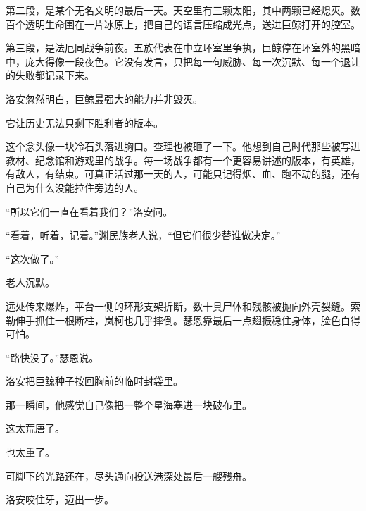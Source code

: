 第二段，是某个无名文明的最后一天。天空里有三颗太阳，其中两颗已经熄灭。数百个透明生命围在一片冰原上，把自己的语言压缩成光点，送进巨鲸打开的腔室。

第三段，是法厄同战争前夜。五族代表在中立环室里争执，巨鲸停在环室外的黑暗中，庞大得像一段夜色。它没有发言，只把每一句威胁、每一次沉默、每一个退让的失败都记录下来。

洛安忽然明白，巨鲸最强大的能力并非毁灭。

它让历史无法只剩下胜利者的版本。

这个念头像一块冷石头落进胸口。查理也被砸了一下。他想到自己时代那些被写进教材、纪念馆和游戏里的战争。每一场战争都有一个更容易讲述的版本，有英雄，有敌人，有结束。可真正活过那一天的人，可能只记得烟、血、跑不动的腿，还有自己为什么没能拉住旁边的人。

“所以它们一直在看着我们？”洛安问。

“看着，听着，记着。”渊民族老人说，“但它们很少替谁做决定。”

“这次做了。”

老人沉默。

远处传来爆炸，平台一侧的环形支架折断，数十具尸体和残骸被抛向外壳裂缝。索勒伸手抓住一根断柱，岚柯也几乎摔倒。瑟恩靠最后一点翅振稳住身体，脸色白得可怕。

“路快没了。”瑟恩说。

洛安把巨鲸种子按回胸前的临时封袋里。

那一瞬间，他感觉自己像把一整个星海塞进一块破布里。

这太荒唐了。

也太重了。

可脚下的光路还在，尽头通向投送港深处最后一艘残舟。

洛安咬住牙，迈出一步。
